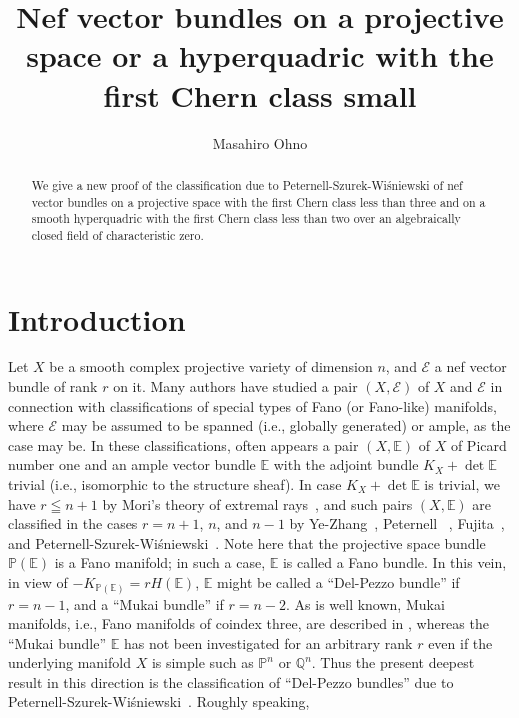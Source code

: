 \documentclass[a4paper,12pt]{amsart}
\title[Nef vector bundles on a projective space or a hyperquadric]
{Nef vector bundles on a projective space or a hyperquadric
with the first Chern class small}
\author{Masahiro Ohno
}
\begin{document}
\begin{abstract}
We give a new proof of the classification 
due to  Peternell-Szurek-Wi\'{s}niewski
of nef vector bundles on a projective space
with the first Chern class less than three
and on a smooth hyperquadric
with the first Chern class less than two
over an algebraically closed field of characteristic zero.
\end{abstract}

\maketitle

\section{Introduction}
Let $X$ be a smooth complex projective variety of dimension $n$,
and 
$\mathcal{E}$ 
a nef vector bundle of rank $r$ on it.
Many authors have studied a pair $(X,\mathcal{E})$
of $X$ and $\mathcal{E}$
in connection with classifications of special types of Fano (or Fano-like) manifolds,
where $\mathcal{E}$
may be assumed
to be 
spanned (i.e., globally generated)
or ample,
as the case may be.
In these classifications, often appears a pair $(X, \mathbb{E})$ of 
$X$ of Picard number one
and an ample vector bundle
$\mathbb{E}$ with the adjoint bundle $K_X+\det\mathbb{E}$ trivial (i.e., isomorphic to the structure sheaf).
In case 
$K_X+\det\mathbb{E}$ is trivial, 
we have $r\leqq n+1$ by Mori's theory of extremal rays~\cite{mo2},
and such pairs $(X,\mathbb{E})$ are classified in the cases $r=n+1$, $n$, and $n-1$
by Ye-Zhang~\cite{yz}, Peternell~\cite{p0} \cite{p}, Fujita~\cite{fn}, and Peternell-Szurek-Wi\'{s}niewski~\cite{psw}.
Note here that 
the 
projective space bundle $\mathbb{P}(\mathbb{E})$ is a Fano manifold;
in such a case, $\mathbb{E}$ is called a Fano bundle.
In this vein, in view of  $-K_{\mathbb{P}(\mathbb{E})}=rH(\mathbb{E})$,
$\mathbb{E}$ might be called a ``Del-Pezzo bundle''
if $r=n-1$, and a ``Mukai bundle''
if $r=n-2$.
As is well known, 
Mukai manifolds,
i.e., Fano manifolds of coindex three,
are 
described in
\cite{MR0995400},
whereas 
the ``Mukai bundle'' $\mathbb{E}$
has not been investigated for an arbitrary rank $r$
even if the underlying manifold
$X$ is simple such as $\mathbb{P}^n$ or $\mathbb{Q}^n$.
Thus the present
deepest result in this direction 
is the classification of ``Del-Pezzo bundles'' due to  Peternell-Szurek-Wi\'{s}niewski~\cite{psw}.
Roughly
speaking,
\end{document}
